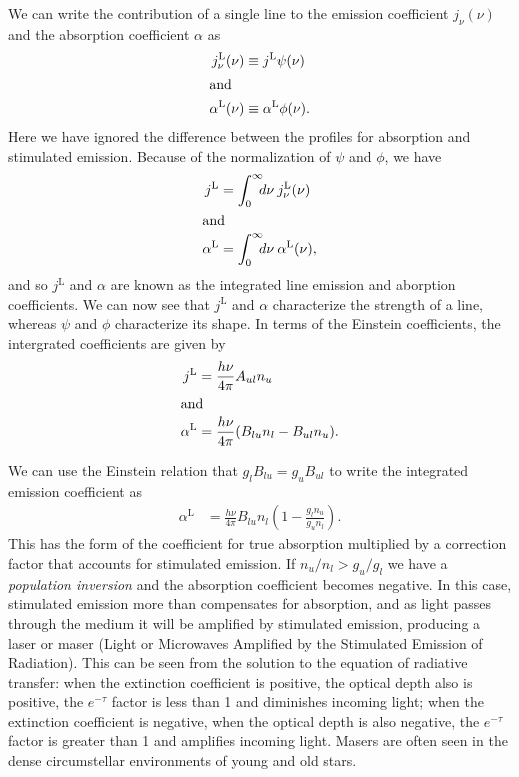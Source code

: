We can write the contribution of a single line to the
emission coefficient $j_\nu(\nu)$ and the absorption
coefficient $\alpha$ as
\begin{align}
j_\nu^\mathrm{L}(\nu) &\equiv j^\mathrm{L} \psi(\nu)\\
\intertext{and}
\alpha^\mathrm{L}(\nu) &\equiv \alpha^\mathrm{L} \phi(\nu).
\end{align}
Here we have ignored the difference between the profiles for
absorption and stimulated emission. Because of the
normalization of $\psi$ and $\phi$, we have
\begin{align}
j^\mathrm{L} &= \int_0^\infty\!\!\!d\nu\:j_\nu^\mathrm{L}(\nu)\\
\intertext{and}
\alpha^\mathrm{L} &= \int_0^\infty\!\!\!d\nu\:\alpha^\mathrm{L}(\nu),
\end{align}
and so $j^\mathrm{L}$ and $\alpha$ are known as the
integrated line emission and aborption coefficients. We can
now see that $j^\mathrm{L}$ and $\alpha$ characterize
the strength of a line, whereas $\psi$ and $\phi$
characterize its shape. In terms of the Einstein
coefficients, the intergrated coefficients are given by
\begin{align}
j^\mathrm{L} &= \frac{h\nu}{4\pi} A_{ul} n_u\\
\intertext{and}
\alpha^\mathrm{L} &= \frac{h\nu}{4\pi} (B_{lu} n_l - B_{ul}
n_u).
\end{align}

We can use the Einstein relation that $g_l B_{lu} = g_u
B_{ul}$ to write the integrated emission coefficient as
\begin{align}
\alpha^\mathrm{L} &= \frac{h\nu}{4\pi} B_{lu} n_l \left(1 - 
\frac{g_l n_u}{g_u n_l}\right).
\end{align}
This has the form of the coefficient for true absorption
multiplied by a correction factor that accounts for
stimulated emission. If $n_u/n_l > g_u/g_l$ we have a
\emph{population inversion} and the absorption coefficient
becomes negative. In this case, stimulated emission more
than compensates for absorption, and as light passes through
the medium it will be amplified by stimulated emission,
producing a laser or maser (Light or Microwaves Amplified by
the Stimulated Emission of Radiation). This can be seen from
the solution to the equation of radiative transfer: when the
extinction coefficient is positive, the optical depth also
is positive, the $e^{-\tau}$ factor is less than 1 and
diminishes incoming light; when the extinction coefficient
is negative, when the optical depth is also negative, the
$e^{-\tau}$ factor is greater than 1 and amplifies incoming
light. Masers are often seen in the dense circumstellar
environments of young and old stars.

